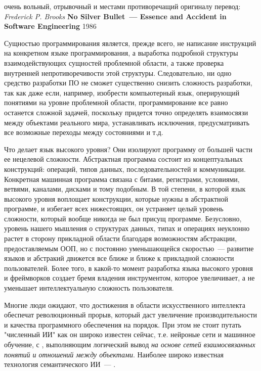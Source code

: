 
\noindent
очень вольный, отрывочный и местами противоречащий оригиналу перевод: 
\textit{Frederick P. Brooks} \textbf{No Silver Bullet\ --- Essence and Accident
in Software Engineering} 1986
\bigskip

Сущностью программирования является, прежде всего, не написание инструкций на
конкретном языке программирования, а выработка подробной структуры
взаимодействующих сущностей проблемной области, а также проверка внутренней
непротиворечивости этой структуры.
Следовательно, ни одно средство разработки ПО не сможет существенно снизить
сложность разработки, так как даже если, например, изобрести компьютерный язык,
оперирующий понятиями на уровне проблемной области, программирование все равно
останется сложной задачей, поскольку придется точно определять взаимосвязи между
объектами реального мира, устанавливать исключения, предусматривать все
возможные переходы между состояниями и т.д.

Что делает язык высокого уровня? Они изолируют программу от большей части ее
нецелевой сложности. Абстрактная программа состоит из концептуальных
конструкций: операций, типов данных, последовательностей и коммуникации.
Конкретная машинная программа связана с битами, регистрами, условиями, ветвями,
каналами, дисками и тому подобным. В той степени, в которой язык высокого уровня
воплощает конструкции, которые нужны в абстрактной программе, и избегает всех
нижестоящих, он устраняет целый уровень сложности, который вообще никогда не был
присущ программе. Безусловно, уровень нашего мышления о структурах данных, типах
и операциях неуклонно растет в сторону прикладной области благодаря
возможностям абстракции, предоставляемым ООП, но с постоянно уменьшающейся
скоростью\ --- развитие языков и абстракий движется все ближе и ближе к
прикладной сложности пользователей. Более того, в какой-то момент разработка
языка высокого уровня и фреймворков создает бремя владения инструментом, которое
увеличивает, а не уменьшает интеллектуальную сложность пользователя.

Многие люди ожидают, что достижения в области искусственного интеллекта
обеспечат революционный прорыв, который даст увеличение производительности и
качества программного обеспечения на порядок. При этом не стоит путать
"численный ИИ" как он широко известен сейчас, т.е. нейроные сети и машинное
обучение, с , выполняющим логический вывод \emph{на
основе сетей взаимосвязанных понятий и отношений между объектами}. Наиболее
широко известная технология семантического ИИ\ --- .

